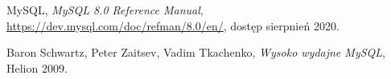\begin{thebibliography}{}
	
	 MySQL, \emph{MySQL 8.0 Reference Manual}, \url{https://dev.mysql.com/doc/refman/8.0/en/}, dostęp sierpnień 2020.
	
	 Baron Schwartz, Peter Zaitsev, Vadim Tkachenko,  \emph{Wysoko wydajne MySQL}, Helion 2009.
	
	
	
\end{thebibliography}